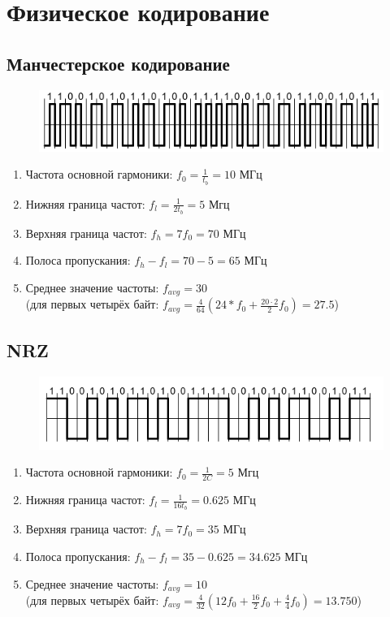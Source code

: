 \documentclass[12pt, a4paper] {ncc}
\begin{document}
\section*{Физическое кодирование}
	\subsection*{Манчестерское кодирование}
		\begin{figure}[h!]
			\includegraphics{../img/Manchester.png}
		\end{figure}
		\begin{enumerate}
			\item Частота основной гармоники: $f_0 = \frac {1} {t_b} = 10$ МГц 
			\item Нижняя граница частот: $f_l = \frac {1} {2t_b} = 5$ Мгц
			\item Верхняя граница частот: $f_h = 7f_0 = 70$ МГц
			\item Полоса пропускания: $f_h - f_l = 70 - 5 = 65$ МГц 
			\item Среднее значение частоты: $f_{avg} = 30$ \\
				  (для первых четырёх байт: $f_{avg} = \frac {4} {64} (24*f_0 + \frac {20 \cdot 2} {2} f_0) = 27.5 $)
		\end{enumerate}
	\subsection*{NRZ}
		\begin{figure}[h!]
			\includegraphics{../img/NRZ.png}
		\end{figure}
		\begin{enumerate}
			\item Частота основной гармоники: $f_0 = \frac {1} {2C} = 5$ Мгц
			\item Нижняя граница частот: $f_l = \frac {1} {16t_b} = 0.625$ МГц
			\item Верхняя граница частот: $f_h = 7f_0 = 35$ МГц 
 			\item Полоса пропускания: $f_h - f_l = 35 - 0.625 = 34.625$ МГц 
			\item Среднее значение частоты: $f_{avg} = 10$ \\
				  (для первых четырёх байт: $f_{avg} = \frac {4} {32} (12f_0 + \frac {16} {2} f_0 + \frac {4} {4} f_0) = 13.750$)
		\end{enumerate}
\end{document}
